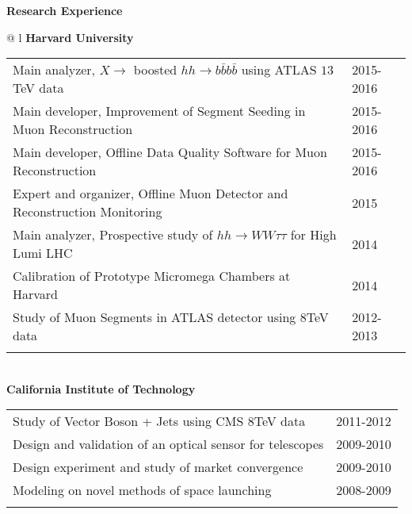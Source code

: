 \documentclass[letterpaper,11pt,oneside]{article}
\begin{document}
 \raggedright
 \textbf{\Large{Research Experience}} \\
 \normalsize
\begin{flushleft}
\hspace{1cm}
 \begin{tabular}{@{} l}
    \textbf{Harvard University} \\ 
    \begin{tabular}{@{} l l }
 Main analyzer, $X \to$ boosted $ hh \to b\bar{b}b\bar{b}$ using ATLAS $13$TeV data & 2015-2016\\
 Main developer, Improvement of Segment Seeding in Muon Reconstruction & 2015-2016\\
 Main developer, Offline Data Quality Software for Muon Reconstruction & 2015-2016\\
 Expert and organizer,  Offline Muon Detector and Reconstruction Monitoring & 2015\\
 Main analyzer, Prospective study of $hh \to WW\tau\tau$ for High Lumi LHC & 2014\\
 Calibration of Prototype Micromega Chambers at Harvard & 2014\\
 Study of Muon Segments in ATLAS detector using $8$TeV data & 2012-2013\\
    \hspace{0.8\linewidth} & \hspace{0.1\linewidth} \\
     \end{tabular}
     \\
     \textbf{California Institute of Technology} \\
     \begin{tabular}{@{} l l }
 Study of Vector Boson + Jets using CMS $8$TeV data&2011-2012\\
 Design and validation of an optical sensor for telescopes&2009-2010\\
 Design experiment and study of market convergence &2009-2010\\
 Modeling on novel methods of space launching&2008-2009\\
    \hspace{0.8\linewidth} & \hspace{0.1\linewidth} \\
      \end{tabular}
      \end{tabular}
\end{flushleft}
\newpage
\end{document}
